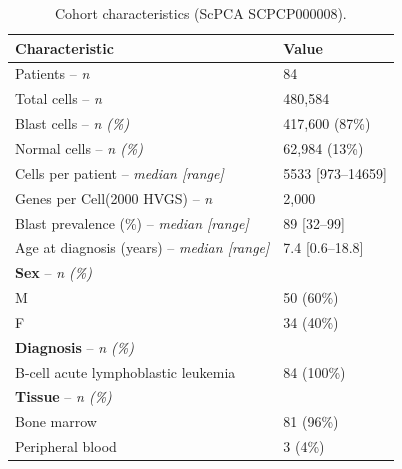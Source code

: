 \begin{table}
\centering
\renewcommand{\arraystretch}{1.4}
\setlength{\tabcolsep}{15pt}
\caption{Cohort characteristics (ScPCA SCPCP000008).}
\label{tab:cohort}
\begin{tabular}{ll}
\toprule
\textbf{Characteristic} & \textbf{Value} \\
\midrule
Patients -- \textit{\footnotesize n} & 84 \\
Total cells -- \textit{\footnotesize n} & 480,584 \\
Blast cells -- \textit{\footnotesize n (\%)} & 417,600 (87\%) \\
Normal cells -- \textit{\footnotesize n (\%)} & 62,984 (13\%) \\
Cells per patient -- \textit{\footnotesize median [range]} & 5533 [973--14659] \\
Genes per Cell(2000 HVGS) -- \textit{\footnotesize n} & 2,000 \\
Blast prevalence (\%) -- \textit{\footnotesize median [range]} & 89 [32--99] \\
Age at diagnosis (years) -- \textit{\footnotesize median [range]} & 7.4 [0.6--18.8] \\
\addlinespace
\textbf{Sex} -- \textit{\footnotesize n (\%)} & \\
\quad M & 50 (60\%) \\
\quad F & 34 (40\%) \\
\addlinespace
\textbf{Diagnosis} -- \textit{\footnotesize n (\%)} & \\
\quad B-cell acute lymphoblastic leukemia & 84 (100\%) \\
\addlinespace
\textbf{Tissue} -- \textit{\footnotesize n (\%)} & \\
\quad Bone marrow & 81 (96\%) \\
\quad Peripheral blood & 3 (4\%) \\
\bottomrule
\end{tabular}
\end{table}
